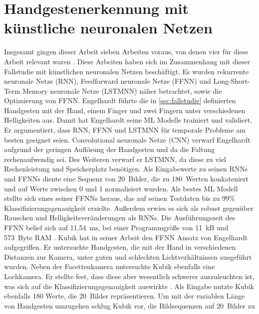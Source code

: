 \section{Handgestenerkennung mit künstliche neuronalen Netzen}
Insgesamt gingen dieser Arbeit sieben Arbeiten voraus, von denen vier für diese Arbeit relevant waren \cite{engelhardtThesis, kubikThesis, klischThesis, gieseThesis}.
Diese Arbeiten haben sich im Zusammenhang mit dieser Fallstudie mit künstlichen neuronalen Netzen beschäftigt. Es wurden rekurrente neuronale Netze (RNN), Feedforward neuronale Netze (FFNN) und
Long-Short-Term Memory neuronale Netze (LSTMNN) näher betrachtet, sowie die Optimierung von FFNN.
\newline
\newline
Engelhardt führte die in \ref{sec:fallstudie} definierten Handgesten mit der Hand, einem Finger und zwei Fingern unter verschiedenen Helligkeiten aus. Damit hat Engelhardt seine ML Modelle trainiert und validiert. Er
argumentiert, dass RNN, FFNN und LSTMNN für temporale Probleme am besten geeignet seien. Convolutional neuronale
Netze (CNN) verwarf Engelhardt aufgrund der geringen Auflösung der Handgesten und da die Faltung rechenaufwendig sei. Des Weiteren verwarf er LSTMNN, da diese zu viel Rechenleistung und Speicherplatz
benötigen. Als Eingabewerte zu seinen RNNs und FFNNs diente eine Sequenz von 20~Bilder, die zu 180~Werten konkateniert und auf Werte zwischen 0 und 1 normalisiert wurden. Als bestes ML Modell stellte sich eines
seiner FFNNs heraus, das auf seinen Testdaten bis zu 99\% Klassifizierungsgenauigkeit erzielte. Außerdem erwies es sich als robust gegenüber Rauschen und Helligkeitsveränderungen als RNNs. Die Ausführungszeit
des FFNN belief sich auf 11,54~ms, bei einer Programmgröße von 11~kB und 573~Byte RAM \cite{engelhardtThesis}.
\newline
\newline
Kubik hat in seiner Arbeit den FFNN Ansatz von Engelhardt aufgegriffen. Er untersuchte Handgesten, die mit der Hand in verschiedenen Distanzen zur Kamera, unter guten und schlechten Lichtverhältnissen ausgeführt wurden.
Neben der Facettenkamera untersuchte Kubik ebenfalls eine Lochkamera. Er stellte fest, dass diese aber wesentlich schwerer auszuleuchten ist, was sich auf die
Klassifizierungsgenauigkeit auswirkte \cite{kubikThesis}.
\newline
\newline
Als Eingabe nutzte Kubik ebenfalls 180 Werte, die 20~Bilder repräsentieren. Um mit der variablen Länge von Handgesten umzugehen schlug Kubik vor, die Bildsequenzen auf 20~Bilder zu
